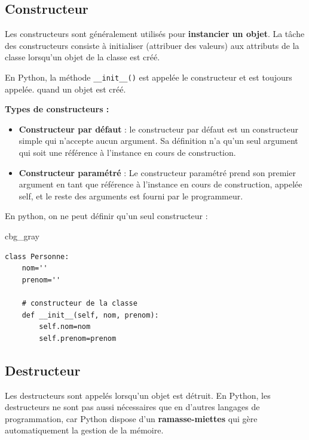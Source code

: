 \documentclass[%
oneside,                 %
final,                   %
10pt]{article}
\newenvironment{_cod_tight}[1]{
   \def\FrameCommand{\colorbox{#1}}
   \FrameRule0.6pt\MakeFramed {\FrameRestore}\vskip3mm}
   {\vskip0mm\endMakeFramed}
\newenvironment{cod}[1]{
\bgroup\rmfamily
\fboxsep=0mm\relax
\begin{_cod_tight}{#1}
\list{}{\parsep=-2mm\parskip=0mm\topsep=0pt\leftmargin=2mm
\rightmargin=2\leftmargin\leftmargin=4pt\relax}
\item\relax}
{\endlist\end{_cod_tight}\egroup}
\begin{document}
\subsection{Constructeur}

Les constructeurs sont généralement utilisés pour \textbf{instancier un objet}. La tâche des constructeurs consiste à initialiser (attribuer des valeurs) aux attributs de la classe lorsqu'un objet de la classe est créé.

En Python, la méthode \Verb!__init__()! est appelée le constructeur et est toujours appelée. quand un objet est créé.

\textbf{Types de constructeurs :}

\begin{itemize}
\item \textbf{Constructeur par défaut} : le constructeur par défaut est un constructeur simple qui n’accepte aucun argument. Sa définition n’a qu’un seul argument qui soit une référence à l’instance en cours de construction.

\item \textbf{Constructeur paramétré} : Le constructeur paramétré prend son premier argument en tant que référence à l'instance en cours de construction, appelée self, et le reste des arguments est fourni par le programmeur.
\end{itemize}

\noindent
En python, on ne peut définir qu'un seul constructeur :

\begin{cod}{cbg_gray}\begin{verbatim}
class Personne:
    nom=''
    prenom=''

    # constructeur de la classe
    def __init__(self, nom, prenom):
        self.nom=nom
        self.prenom=prenom
\end{verbatim}
\end{cod}
\noindent

\subsection{Destructeur}
Les destructeurs sont appelés lorsqu'un objet est détruit. En Python, les destructeurs ne sont pas aussi nécessaires que en d'autres langages de programmation, car Python dispose d'un \textbf{ramasse-miettes} qui gère automatiquement la gestion de la mémoire.
\end{document}
